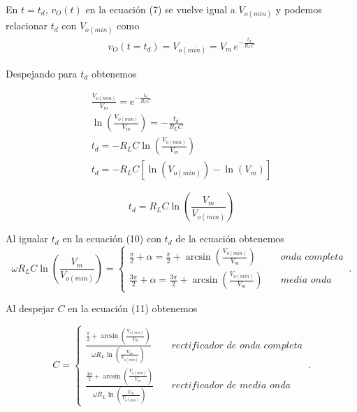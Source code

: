 \documentclass{article}
\begin{document}
\noindent En $t = t_d$, $v_O(t)$ en la ecuación (7) se vuelve igual a $V_{o(min)}$ y podemos relacionar $t_d$ con $V_{o(min)}$ como
\begin{align}
	v_O (t = t_d) = V_{o(min)} = V_m \, e^{ -\frac{t_d}{R_L C} }
\end{align}

\noindent Despejando para $t_d$ obtenemos

\begin{align*}
	\frac{V_{o(min)}}{V_m} = e^{ -\frac{t_d}{R_L C} }\\
	\ln{ \left( \frac{V_{o(min)}}{V_m} \right) } = - \frac{t_d}{R_L C}\\
	t_d = -R_L C \ln{ \left( \frac{V_{o(min)}}{V_m} \right) }\\
	t_d = -R_L C \left[ \ln( V_{o(min)} )- \ln (V_m) \right]
\end{align*}

\begin{tcolorbox}[colback=red!5!white,colframe=red!75!black,arc=0mm,boxrule=0mm,width=(\linewidth+0.5cm)]
	\begin{equation}
		t_d = R_L C\ln \left( \frac{V_m}{V_{o(min)}} \right)
	\end{equation}
\end{tcolorbox}

\noindent Al igualar $t_d$ en la ecuación (10) con $t_d$ de la ecuación obtenemos
\begin{equation}
	\omega R_L C\ln \left( \frac{V_m}{V_{o(min)}} \right) =  
	\begin{cases}
		\frac{\pi}{2} + \alpha = \frac{\pi}{2} + \arcsin\left(  \frac{V_{o(min)}}{V_m}\right) \quad & onda \,\, completa\\
		\frac{3\pi}{2} + \alpha = \frac{3\pi}{2} + \arcsin\left(  \frac{V_{o(min)}}{V_m}\right) \quad & media \,\, onda
	\end{cases}\,.
\end{equation}

\noindent Al despejar $C$ en la ecuación (11) obtenemos
\begin{tcolorbox}[colback=red!5!white,colframe=red!75!black,arc=0mm,boxrule=0mm,width=(\linewidth+0.5cm)]
	\begin{equation}
		C = 
		\begin{cases}
			\frac{\frac{\pi}{2} + \arcsin \left( \frac{V_{o(min)}}{V_m} \right) }{\omega R_L \ln \left( \frac{V_m}{V_{o(min)}} \right)} \quad & rectificador \,\, de \,\, onda \,\, completa\\
			\frac{\frac{3\pi}{2} + \arcsin \left( \frac{V_{o(min)}}{V_m} \right) }{\omega R_L \ln \left( \frac{V_m}{V_{o(min)}} \right)} \quad & rectificador \,\, de \,\, media \,\, onda
		\end{cases}\,.
	\end{equation}
\end{tcolorbox}
\end{document}
